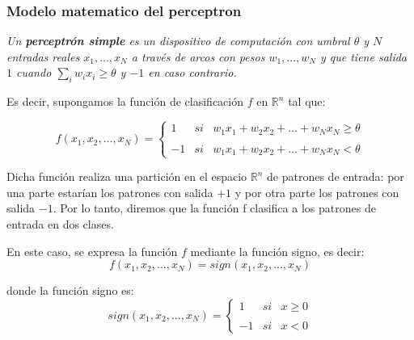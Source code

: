 \documentclass[9pt]{beamer} %
\begin{document}
	\begin{frame}
	\frametitle{Modelo matematico del perceptron}
	\textit{Un \textbf{perceptrón simple} es un dispositivo de computación con umbral $\theta$ y $N$ entradas reales $x_1, ..., x_N$ a través de arcos con pesos $w_1, ..., w_N$ y que tiene salida $1$ cuando $\sum_{i}w_ix_i \geq \theta$ y $-1$ en caso contrario.}

Es decir, supongamos la función  de clasificación $f$ en $\mathbb{R}^n$ tal que:

\[
f(x_1, x_2, ..., x_N) = \left\{ \begin{array}{lcc}
             1 &   si  & w_1x_1 + w_2x_2 + ... + w_Nx_N \geq \theta \\
             \\ -1 &  si  &  w_1x_1 + w_2x_2 + ... + w_Nx_N < \theta
             \end{array}
   \right.
\]

Dicha función realiza una partición en el espacio $\mathbb{R}^n$ de patrones de entrada: por una parte estarían los patrones con salida $+1$ y por otra parte los patrones con salida $- 1$. Por lo tanto, diremos que la función f clasifica a los patrones de entrada en dos clases.

En este caso, se expresa la función $f$ mediante la función signo, es decir:
\[
f(x_1, x_2, ..., x_N) = sign(x_1, x_2, ..., x_N)
\]

donde la función signo es:
\[
sign(x_1, x_2, ..., x_N) = \left\{ \begin{array}{lcc}
             1 &   si  & x \geq 0 \\
             \\ -1 &  si  &  x < 0
             \end{array}
   \right.
\]
	\end{frame}
\end{document}
